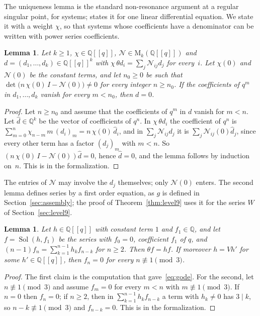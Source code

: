 \documentclass[11pt]{amsart}
\newtheorem{lemma}[theorem]{Lemma}
\theoremstyle{definition}
\numberwithin{equation}{section}
\newcommand{\lean}[1]{\ignorespaces}
\newcommand{\Q}{\mathbb{Q}}
\newcommand{\Sol}{\operatorname{Sol}}
\begin{document}
The uniqueness lemma is the standard non-resonance argument at a regular singular point, for systems; \cite[\S4.2, Proposition~4.3]{BLS17} states it for one linear differential equation. We state it with a weight $\chi$, so that systems whose coefficients have a denominator can be written with power series coefficients.

\begin{lemma}\label{lem:U}\lean{CalegariSlopes.Bridge.lemmaU}
Let $k\ge1$, $\chi\in\Q[[q]]$, $\mathcal N\in\mathrm{M}_k(\Q[[q]])$ and $d=(d_1,\ldots,d_k)\in\Q[[q]]^k$ with $\chi\,\theta d_i=\sum_j\mathcal N_{ij}d_j$ for every~$i$. Let $\chi(0)$ and $\mathcal N(0)$ be the constant terms, and let $n_0\ge0$ be such that $\det\bigl(n\,\chi(0)\,I-\mathcal N(0)\bigr)\ne0$ for every integer $n\ge n_0$. If the coefficients of $q^m$ in $d_1,\ldots,d_k$ vanish for every $m<n_0$, then $d=0$.
\end{lemma}

\begin{proof}
Let $n\ge n_0$ and assume that the coefficients of $q^m$ in $d$ vanish for $m<n$. Let $\hat d\in\Q^k$ be the vector of coefficients of $q^n$. In $\chi\,\theta d_i$ the coefficient of $q^n$ is $\sum_{m=0}^n\chi_{n-m}\,m\,(d_i)_m=n\,\chi(0)\,\hat d_i$, and in $\sum_j\mathcal N_{ij}d_j$ it is $\sum_j\mathcal N_{ij}(0)\hat d_j$, since every other term has a factor $(d_j)_m$ with $m<n$. So $(n\,\chi(0)\,I-\mathcal N(0))\hat d=0$, hence $\hat d=0$, and the lemma follows by induction on~$n$. This is  in the formalization.
\end{proof}

The entries of $\mathcal N$ may involve the $d_j$ themselves; only $\mathcal N(0)$ enters. The second lemma defines series by a first order equation, as $g$ is defined in Section~\ref{sec:assembly}; the proof of Theorem~\ref{thm:level9} uses it for the series $W$ of Section~\ref{sec:level9}.

\begin{lemma}\label{lem:sol}\lean{CalegariSlopes.Bridge.Level9.coeff_Sol_V3, CalegariSlopes.Bridge.theta_Sol}
Let $h\in\Q[[q]]$ with constant term $1$ and $f_1\in\Q$, and let $f=\Sol(h,f_1)$ be the series with $f_0=0$, coefficient $f_1$ of $q$, and $(n-1)f_n=\sum_{k=1}^{n-1}h_kf_{n-k}$ for $n\ge2$. Then $\theta f=hf$. If moreover $h=Vh'$ for some $h'\in\Q[[q]]$, then $f_n=0$ for every $n\not\equiv1\pmod 3$.
\end{lemma}

\begin{proof}
The first claim is the computation that gave~\eqref{eq:gode}. For the second, let $n\not\equiv1\pmod3$ and assume $f_m=0$ for every $m<n$ with $m\not\equiv1\pmod3$. If $n=0$ then $f_n=0$; if $n\ge2$, then in $\sum_{k=1}^{n-1}h_kf_{n-k}$ a term with $h_k\ne0$ has $3\mid k$, so $n-k\not\equiv1\pmod 3$ and $f_{n-k}=0$. This is  in the formalization.
\end{proof}
\end{document}

